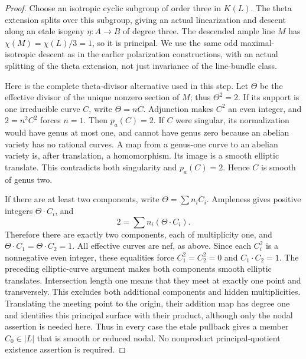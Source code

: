 \begin{proof}
Choose an isotropic cyclic subgroup of order three in \(K(L)\).
The theta extension splits over this subgroup, giving an actual
linearization and descent along an etale isogeny
\(\eta:A\to B\) of degree three. The descended ample line
\(M\) has \(\chi(M)=\chi(L)/3=1\), so it is principal.
We use the same odd maximal-isotropic descent as in the earlier
polarization constructions, with an actual splitting of the theta
extension, not just invariance of the line-bundle class.

Here is the complete theta-divisor alternative used in this step.
Let \(\Theta\) be the effective divisor of the unique nonzero
section of \(M\); thus \(\Theta^2=2\). If its support is one
irreducible curve \(C\), write \(\Theta=nC\). Adjunction makes
\(C^2\) an even integer, and \(2=n^2C^2\) forces \(n=1\).
Then \(p_a(C)=2\). If \(C\) were singular, its normalization
would have genus at most one, and cannot have genus zero because
an abelian variety has no rational curves. A map from a genus-one
curve to an abelian variety is, after translation, a homomorphism.
Its image is a smooth elliptic translate. This contradicts both
singularity and \(p_a(C)=2\). Hence \(C\) is smooth of genus two.

If there are at least two components, write
\(\Theta=\sum n_i C_i\). Ampleness gives positive integers
\(\Theta\cdot C_i\), and
\[
                   2=\sum n_i(\Theta\cdot C_i).
\]
Therefore there are exactly two components, each of multiplicity
one, and \(\Theta\cdot C_1=\Theta\cdot C_2=1\).
All effective curves are nef, as above. Since each \(C_i^2\)
is a nonnegative even integer, these equalities force
\(C_1^2=C_2^2=0\) and \(C_1\cdot C_2=1\).
The preceding elliptic-curve argument makes both components
smooth elliptic translates. Intersection length one means that
they meet at exactly one point and transversely. This excludes
both additional components and hidden multiplicities. Translating
the meeting point to the origin, their addition map has degree
one and identifies this principal surface with their product,
although only the nodal assertion is needed here.
Thus in every case the etale pullback gives a member
\(C_0\in|L|\) that is smooth or reduced nodal. No nonproduct
principal-quotient existence assertion is required.


\end{proof}
